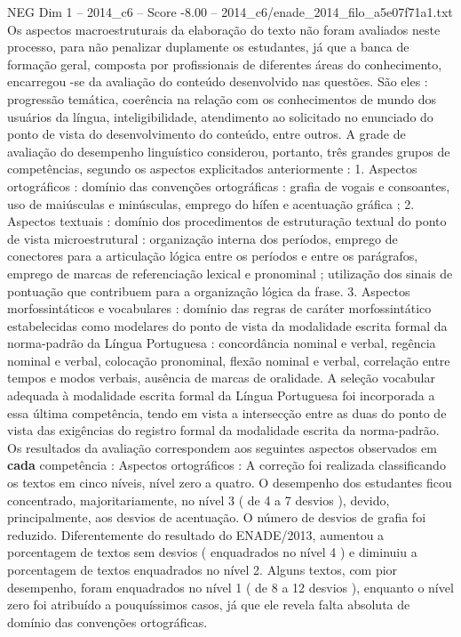 \begin{textsample}{NEG Dim 1 – 2014\_c6 – Score -8.00 – 2014\_c6/enade\_2014\_filo\_a5e07f71a1.txt}
Os aspectos macroestruturais da elaboração do texto não foram avaliados neste processo, para não penalizar duplamente os estudantes, já que a banca de formação geral, composta por profissionais de diferentes áreas do conhecimento, encarregou -se da avaliação do conteúdo desenvolvido nas questões.
São eles : progressão temática, coerência na relação com os conhecimentos de mundo dos usuários da língua, inteligibilidade, atendimento ao solicitado no enunciado do ponto de vista do desenvolvimento do conteúdo, entre outros.
A grade de avaliação do desempenho linguístico considerou, portanto, três grandes grupos de competências, segundo os aspectos explicitados anteriormente : 1.
Aspectos ortográficos : domínio das convenções ortográficas : grafia de vogais e consoantes, uso de maiúsculas e minúsculas, emprego do hífen e acentuação gráfica ; 2.
Aspectos textuais : domínio dos procedimentos de estruturação textual do ponto de vista microestrutural : organização interna dos períodos, emprego de conectores para a articulação lógica entre os períodos e entre os parágrafos, emprego de marcas de referenciação lexical e pronominal ; utilização dos sinais de pontuação que contribuem para a organização lógica da frase. 3.
Aspectos morfossintáticos e vocabulares : domínio das regras de caráter morfossintático estabelecidas como modelares do ponto de vista da modalidade escrita formal da norma-padrão da Língua Portuguesa : concordância nominal e verbal, regência nominal e verbal, colocação pronominal, flexão nominal e verbal, correlação entre tempos e modos verbais, ausência de marcas de oralidade.
A seleção vocabular adequada à modalidade escrita formal da Língua Portuguesa foi incorporada a essa última competência, tendo em vista a intersecção entre as duas do ponto de vista das exigências do registro formal da modalidade escrita da norma-padrão.
Os resultados da avaliação correspondem aos seguintes aspectos observados em \textbf{cada} competência : Aspectos ortográficos : A correção foi realizada classificando os textos em cinco níveis, nível zero a quatro.
O desempenho dos estudantes ficou concentrado, majoritariamente, no nível 3 ( de 4 a 7 desvios ), devido, principalmente, aos desvios de acentuação.
O número de desvios de grafia foi reduzido.
Diferentemente do resultado do ENADE/2013, aumentou a porcentagem de textos sem desvios ( enquadrados no nível 4 ) e diminuiu a porcentagem de textos enquadrados no nível 2.
Alguns textos, com pior desempenho, foram enquadrados no nível 1 ( de 8 a 12 desvios ), enquanto o nível zero foi atribuído a pouquíssimos casos, já que ele revela falta absoluta de domínio das convenções ortográficas.

\end{textsample}
